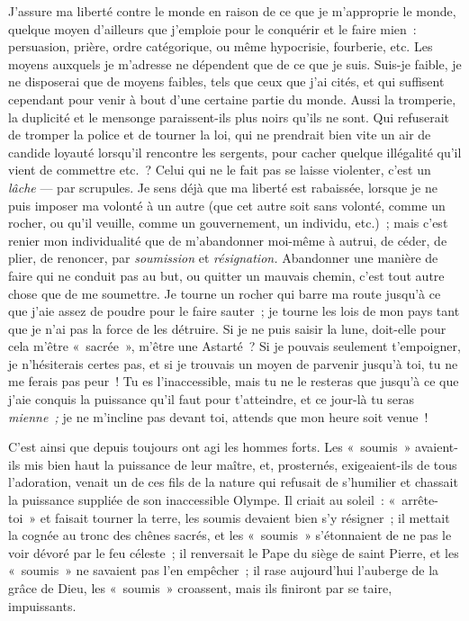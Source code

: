 \documentclass[french,twoside]{book} %
\begin{document}
J’assure ma liberté contre le monde en raison de ce que je m’approprie le monde, quelque moyen d’ailleurs que j’emploie pour le conquérir et le faire mien : persuasion, prière, ordre catégorique, ou même hypocrisie, fourberie, etc. Les moyens auxquels je m’adresse ne dépendent que de ce que je suis. Suis-je faible, je ne disposerai que de moyens faibles, tels que ceux que j’ai cités, et qui suffisent cependant pour venir à bout d’une certaine partie du monde. Aussi la  tromperie, la duplicité et le mensonge paraissent-ils plus noirs qu’ils ne sont. Qui refuserait de tromper la police et de tourner la loi, qui ne prendrait bien vite un air de candide loyauté lorsqu’il rencontre les sergents, pour cacher quelque illégalité qu’il vient de commettre etc. ? Celui qui ne le fait pas se laisse violenter, c’est un \emph{lâche} — par scrupules. Je sens déjà que ma liberté est rabaissée, lorsque je ne puis imposer ma volonté à un autre (que cet autre soit sans volonté, comme un rocher, ou qu’il veuille, comme un gouvernement, un individu, etc.) ; mais c’est renier mon individualité que de m’abandonner moi-même à autrui, de céder, de plier, de renoncer, par \emph{soumission} et \emph{résignation.} Abandonner une manière de faire qui ne conduit pas au but, ou quitter un mauvais chemin, c’est tout autre chose que de me soumettre. Je tourne un rocher qui barre ma route jusqu’à ce que j’aie assez de poudre pour le faire sauter ; je tourne les lois de mon pays tant que je n’ai pas la force de les détruire. Si je ne puis saisir la lune, doit-elle pour cela m’être « sacrée », m’être une Astarté ? Si je pouvais seulement t’empoigner, je n’hésiterais certes pas, et si je trouvais un moyen de parvenir jusqu’à toi, tu ne me ferais pas peur ! Tu es l’inaccessible, mais tu ne le resteras que jusqu’à ce que j’aie conquis la puissance qu’il faut pour t’atteindre, et ce jour-là tu seras \emph{mienne ;} je ne m’incline pas devant toi, attends que mon heure soit venue !\par
C’est ainsi que depuis toujours ont agi les hommes forts. Les « soumis » avaient-ils mis bien haut la puissance de leur maître, et, prosternés, exigeaient-ils de tous l’adoration, venait un de ces fils de la nature qui refusait de s’humilier et chassait la puissance suppliée de son inaccessible Olympe. Il criait au soleil : « arrête-toi » et faisait tourner la terre, les soumis devaient bien s’y résigner ; il mettait la cognée au tronc des chênes sacrés, et les « soumis » s’étonnaient de ne pas le voir dévoré par le feu céleste ;  il renversait le Pape du siège de saint Pierre, et les « soumis » ne savaient pas l’en empêcher ; il rase aujourd’hui l’auberge de la grâce de Dieu, les « soumis » croassent, mais ils finiront par se taire, impuissants.\par
\end{document}
